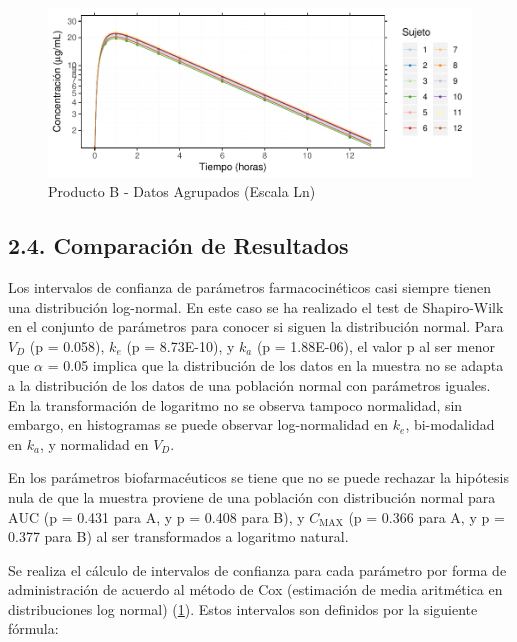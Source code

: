 \documentclass[]{article}
\begin{document}
\begin{figure}[H]

{\centering \includegraphics{parcial_1_files/figure-latex/unnamed-chunk-18-1} 

}

\caption{Producto B - Datos Agrupados (Escala Ln)}\label{fig:unnamed-chunk-18}
\end{figure}

\subsection{2.4. Comparación de
Resultados}\label{comparacion-de-resultados}

Los intervalos de confianza de parámetros farmacocinéticos casi siempre
tienen una distribución log-normal. En este caso se ha realizado el test
de Shapiro-Wilk en el conjunto de parámetros para conocer si siguen la
distribución normal. Para \(V_{D}\) (p = 0.058), \(k_{e}\) (p =
8.73E-10), y \(k_{a}\) (p = 1.88E-06), el valor p al ser menor que
\(\alpha\) = 0.05 implica que la distribución de los datos en la muestra
no se adapta a la distribución de los datos de una población normal con
parámetros iguales. En la transformación de logaritmo no se observa
tampoco normalidad, sin embargo, en histogramas se puede observar
log-normalidad en \(k_{e}\), bi-modalidad en \(k_{a}\), y normalidad en
\(V_{D}\).

En los parámetros biofarmacéuticos se tiene que no se puede rechazar la
hipótesis nula de que la muestra proviene de una población con
distribución normal para \(\textrm{AUC}\) (p = 0.431 para A, y p = 0.408
para B), y \(C_{\textrm{MAX}}\) (p = 0.366 para A, y p = 0.377 para B)
al ser transformados a logaritmo natural.

Se realiza el cálculo de intervalos de confianza para cada parámetro por
forma de administración de acuerdo al método de Cox (estimación de media
aritmética en distribuciones log normal)
(\protect\hyperlink{ref-Olsson2005}{1}). Estos intervalos son definidos
por la siguiente fórmula:
\end{document}
